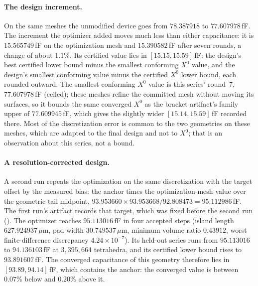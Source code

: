 \documentclass{anvil-paper}
\begin{document}
\paragraph{The design increment.}
On the same meshes the unmodified device goes from $78.387918$ to
$77.607978$\,fF. The increment the optimizer added moves much less than
either capacitance: it is $15.565749$\,fF on the optimization mesh and
$15.390582$\,fF after seven rounds, a change of about $1.1\%$. Its
certified value lies in $[15.15, 15.59]$\,fF: the design's best certified
lower bound minus the smallest conforming $X^0$ value, and the design's
smallest conforming value minus the certified $X^0$ lower bound, each
rounded outward. The smallest conforming $X^0$ value is this series'
round~7, $77.607978$\,fF (ceiled); these meshes refine the committed
mesh without moving its surfaces, so it bounds the same converged $X^0$
as the bracket artifact's family upper of $77.609945$\,fF, which gives the
slightly wider $[15.14, 15.59]$\,fF recorded there. Most of the discretization error is common to the
two geometries on these meshes, which are adapted to the final design
and not to $X^0$; that is an observation about this series, not a bound.

\paragraph{A resolution-corrected design.}
A second run repeats the optimization on the same discretization with
the target offset by the measured bias: the anchor times the
optimization-mesh value over the geometric-tail midpoint,
$93.953660 \times 93.953668 / 92.808473 = 95.112986$\,fF. The first run's
artifact records that target, which was fixed before the second run
().
The optimizer reaches $95.113016$\,fF in four accepted steps (island
length $627.924937\,\mu$m, pad width $30.749537\,\mu$m, minimum volume
ratio $0.43912$, worst finite-difference discrepancy
$4.24\times10^{-7}$). Its held-out series runs from $95.113016$ to
$94.136103$\,fF at $3{,}395{,}664$ tetrahedra, and its certified lower
bound rises to $93.891607$\,fF. The converged capacitance of this
geometry therefore lies in $[93.89, 94.14]$\,fF, which contains the
anchor: the converged value is between $0.07\%$ below and $0.20\%$
above it.
\end{document}
